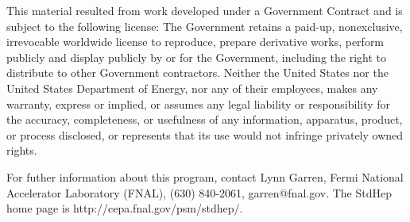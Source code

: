 This material resulted from work developed under a Government Contract
and is subject to the following license:  The Government retains a
paid-up, nonexclusive, irrevocable worldwide license to reproduce,
prepare derivative works, perform publicly and display publicly by or for
the Government,  including the right to distribute to other Government
contractors.  Neither the United States nor the United States Department
of Energy, nor any of their employees, makes any warranty, express or
implied, or assumes any legal liability or responsibility for the
accuracy, completeness, or usefulness of any  information, apparatus,
product, or process disclosed, or represents that its use would not
infringe privately owned rights.

For futher information about this program, contact Lynn Garren,
Fermi National Accelerator Laboratory (FNAL), (630) 840-2061,
garren@fnal.gov.  The StdHep home page is http://cepa.fnal.gov/psm/stdhep/.

\newpage

\setcounter{page}{1}
\tableofcontents

\cleardoublepage
